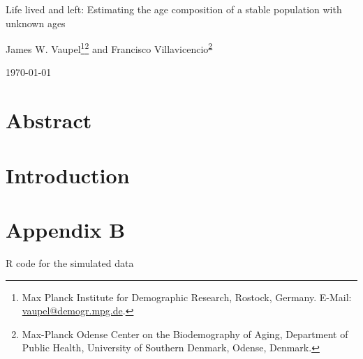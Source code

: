 \documentclass[a4paper,twoside, openright, 12pt, leqno]{article}
\begin{document}
\thispagestyle{empty}

\renewcommand{\thefootnote}{\alph{footnote}}

\hypersetup{allcolors = black, footnotecolor = black, urlcolor = blue}

\begin{center}
    
    \vspace*{.4cm}
    \LARGE{Life lived and left: Estimating the age composition of a stable population with unknown ages}    
    \vspace{.4cm}
   
           
   \vspace{1cm}
    \large James W. Vaupel\footnote{Max Planck Institute for Demographic Research, Rostock, Germany. E-Mail: \href{mailto:vaupel@demogr.mpg.de}{vaupel@demogr.mpg.de}.}\fnsep\footnote{Max-Planck Odense Center on the Biodemography of Aging, Department of Public Health, University of Southern Denmark, Odense, Denmark.\label{MaxO}} and Francisco Villavicencio\textsuperscript{\ref{MaxO}}
    
    \vspace{1cm}
    \large\today
    \vspace{1cm}
    
\end{center}

\renewcommand{\thefootnote}{\arabic{footnote}}
\setcounter{footnote}{0}

\hypersetup{allcolors = blue, footnotecolor = blue}

\section*{Abstract}


\linespread{1.5}\normalsize
\clearpage

\section{Introduction}



\section*{Appendix B}

R code for the simulated data

\linespread{1}\normalsize

\small

%
%
\end{document}
